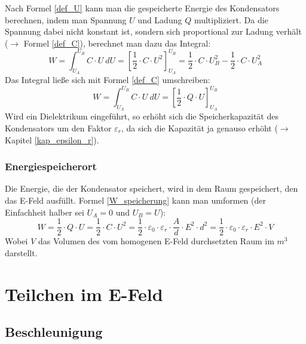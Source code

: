 Nach Formel \ref{def_U} kann man die gespeicherte Energie des Kondensators berechnen, indem man Spannung \(U\) und Ladung \(Q\) multipliziert. Da die Spannung dabei nicht konstant ist, sondern sich proportional zur Ladung verhält (\(\rightarrow\) Formel \ref{def_C}), berechnet man dazu das Integral:
	\begin{equation}
	W = \int^{U_B}_{U_A} C\cdot U ~dU = \left[ \frac{1}{2} \cdot C \cdot U^2 \right]^{U_B}_{U_A} = \frac{1}{2} \cdot C \cdot U^2_B - \frac{1}{2} \cdot C \cdot U_A^2
	\label{W_speicherung}
	\end{equation}
Das Integral ließe sich mit Formel \ref{def_C} umschreiben:
	\begin{equation}
	W = \int^{U_B}_{U_A} C\cdot U ~dU = \left[ \frac{1}{2} \cdot Q \cdot U \right]^{U_B}_{U_A}
	\end{equation}
Wird ein Dielektrikum eingeführt, so erhöht sich die Speicherkapazität des Kondensators um den Faktor \(\varepsilon_r\), da sich die Kapazität ja genauso erhöht (\(\rightarrow\) Kapitel \ref{kap_epsilon_r}).


		\subsection{Energiespeicherort}
Die Energie, die der Kondensator speichert, wird in dem Raum gespeichert, den das E-Feld ausfüllt. Formel \ref{W_speicherung} kann man umformen (der Einfachheit halber sei \(U_A = 0\) und \( U_B = U\)):
	\begin{equation}
	W = \frac{1}{2} \cdot Q \cdot U = \frac{1}{2} \cdot C \cdot U^2 = \frac{1}{2} \cdot \varepsilon_0 \cdot \varepsilon_r \cdot \frac{A}{d} \cdot E^2 \cdot d^2 =  \frac{1}{2} \cdot \varepsilon_0 \cdot \varepsilon_r  \cdot E^2 \cdot V
	\end{equation}
Wobei \(V\) das Volumen des vom homogenen E-Feld durchsetzten Raum im \(m^3\) darstellt.	


		\chapter{Teilchen im E-Feld}
		
		\section{Beschleunigung}
		
